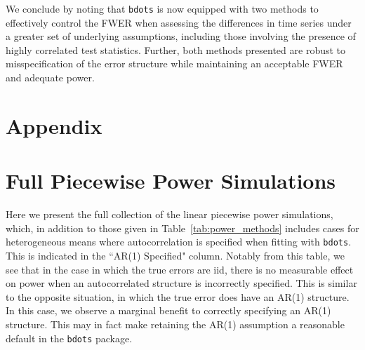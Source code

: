 \documentclass{article}
\newcommand{\xt}{\texttt}
\begin{document}
We conclude by noting that \xt{bdots} is now equipped with two methods to effectively control the FWER when assessing the differences in time series under a greater set of underlying assumptions, including those involving the presence of highly correlated test statistics. Further, both methods presented are robust to misspecification of the error structure while maintaining an acceptable FWER and adequate power. 

\section*{Appendix}

\section{Full Piecewise Power Simulations}

Here we present the full collection of the linear piecewise power simulations, which, in addition to those given in Table~\ref{tab:power_methods} includes cases for heterogeneous means where autocorrelation is specified when fitting with \xt{bdots}. This is indicated in the ``AR(1) Specified" column. Notably from this table, we see that in the case in which the true errors are iid, there is no measurable effect on power when an autocorrelated structure is incorrectly specified.  This is similar to the opposite situation, in which the true error does have an AR(1) structure. In this case, we observe a marginal benefit to correctly specifying an AR(1) structure. This may in fact make retaining the AR(1) assumption a reasonable default in the \xt{bdots} package.
\end{document}

